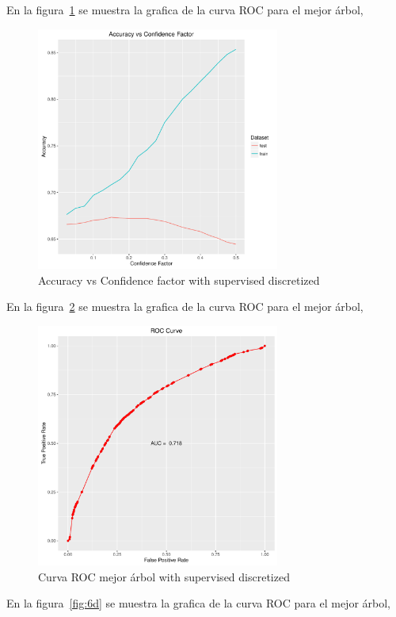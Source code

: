 En la figura~\ref{fig:6b} se muestra la grafica de la curva ROC para el mejor árbol,

\begin{figure}
  \centering
  \includegraphics[width = 8cm]{6b.pdf}
  \caption{Accuracy vs Confidence factor with supervised discretized}
  \label{fig:6b}
\end{figure}

En la figura~\ref{fig:6c} se muestra la grafica de la curva ROC para el mejor árbol,

\begin{figure}
  \centering
  \includegraphics[width = 8cm]{6c.pdf}
  \caption{Curva ROC mejor árbol with supervised discretized}
  \label{fig:6c}
\end{figure}

En la figura~\ref{fig:6d} se muestra la grafica de la curva ROC para el mejor árbol,

